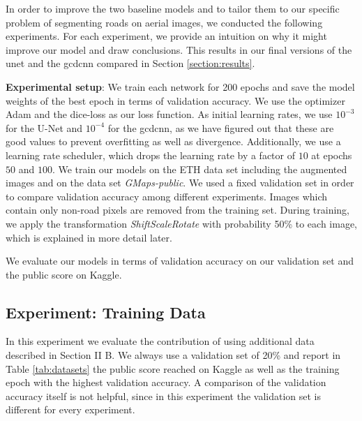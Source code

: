 In order to improve the two baseline models and to tailor them to our specific problem of segmenting roads on aerial images, we conducted the following experiments. For each experiment, we provide an intuition on why it might improve our model and draw conclusions. This results in our final versions of the \acrshort{unet} and the \acrshort{gcdcnn} compared in Section \ref{section:results}.

\textbf{Experimental setup}:
We train each network for 200 epochs and save the model weights of the best epoch in terms of validation accuracy. We use the optimizer Adam and the dice-loss as our loss function. As initial learning rates, we use $10^{-3}$ for the U-Net and $10^{-4}$ for the \acrshort{gcdcnn}, as we have figured out that these are good values to prevent overfitting as well as divergence. Additionally, we use a learning rate scheduler, which drops the learning rate by a factor of $10$ at epochs $50$ and $100$. We train our models on the ETH data set including the augmented images and on the data set \textit{GMaps-public}. We used a fixed validation set in order to compare validation accuracy among different experiments. Images which contain only non-road pixels are removed from the training set. During training, we apply the transformation \textit{ShiftScaleRotate} with probability 50\% to each image, which is explained in more detail later.

 We evaluate our models in terms of validation accuracy on our validation set and the public score on Kaggle. 

\subsection{Experiment: Training Data}
In this experiment we evaluate the contribution of using additional data described in Section II B. 
 We always use a validation set of 20\% and report in Table \ref{tab:datasets} the public score reached on Kaggle as well as the training epoch with the highest validation accuracy. A comparison of the validation accuracy itself is not helpful, since in this experiment the validation set is different for every experiment.
 

